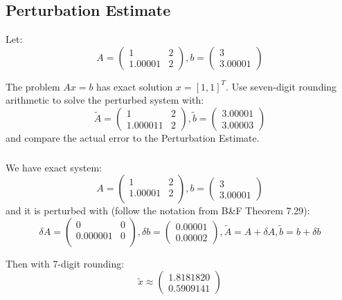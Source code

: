 \documentclass[12pt]{article} %
\newcommand{\1}[1]{\mathds{1}\left[#1\right]}
\begin{document}
\newpage
\subsection{Perturbation Estimate}
Let:
$$
	A = 
	\begin{pmatrix}
		1 & 2 \\
		1.00001 & 2
	\end{pmatrix}, b = 
	\begin{pmatrix}
		3 \\
		3.00001
	\end{pmatrix}
$$

The problem $Ax = b$ has exact solution $x = [1,1]^T$. Use seven-digit rounding arithmetic to solve the perturbed system with:
$$
	\tilde{A} = 
	\begin{pmatrix}
		1 & 2 \\
		1.000011 & 2
	\end{pmatrix}, \tilde{b} =
	\begin{pmatrix}
		3.00001 \\
		3.00003
	\end{pmatrix}
$$ and compare the actual error to the Perturbation Estimate.

\subsubsection{}
We have exact system:
$$
	A = 
	\begin{pmatrix}
		1 & 2 \\
		1.00001 & 2 \\
	\end{pmatrix},
	b =
	\begin{pmatrix}
		3\\
		3.00001
	\end{pmatrix}
$$ and it is perturbed with (follow the notation from B\&F Theorem 7.29):
$$
	\delta A =
	\begin{pmatrix}
		0 & 0 \\
		0.000001 & 0 \\
	\end{pmatrix},
	\delta b =
	\begin{pmatrix}
		0.00001\\
		0.00002
	\end{pmatrix},
	\tilde{A} = A+\delta A, \tilde{b} = b+\delta b
$$

Then with 7-digit rounding:
$$
	\tilde{x} \approx 
	\begin{pmatrix}
		1.8181820\\
		0.5909141
	\end{pmatrix}
$$
\end{document}
